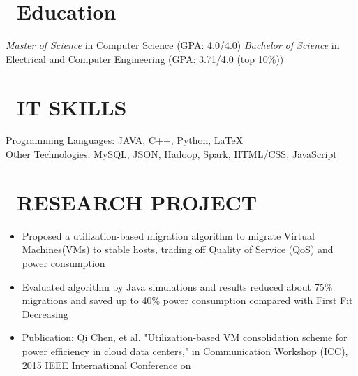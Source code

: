 \documentclass{resume}
\begin{document}


\vspace{-2mm}
\section{\faGraduationCap\ Education}
\textit{Master of Science} in Computer Science (GPA: 4.0/4.0)
\textit{Bachelor of Science} in Electrical and Computer Engineering (GPA: 3.71/4.0 (top 10\%))

\section{\faCogs\ IT SKILLS}
Programming Languages: \hspace{2cm}JAVA, C++, Python, \LaTeX\\
Other Technologies: \hspace{2.85cm}MySQL, JSON, Hadoop, Spark, HTML/CSS, JavaScript
\section{\faUsers\ RESEARCH PROJECT}
\vspace{-3mm}
\normalsize{
\begin{itemize}
  \item Proposed a utilization-based migration algorithm to migrate Virtual Machines(VMs) to stable hosts, trading off Quality of Service (QoS) and power consumption
  \item Evaluated algorithm by Java simulations and results reduced about 75\% migrations and saved up to 40\% power consumption compared with First Fit Decreasing 
  \item Publication: \href{http://www-scf.usc.edu/~chen147/ICC\%20paper.pdf}{Qi Chen, et al. "Utilization-based VM consolidation scheme for power efficiency in cloud data centers," in Communication Workshop (ICC), 2015 IEEE International Conference on}
\end{itemize}
}
\end{document}
